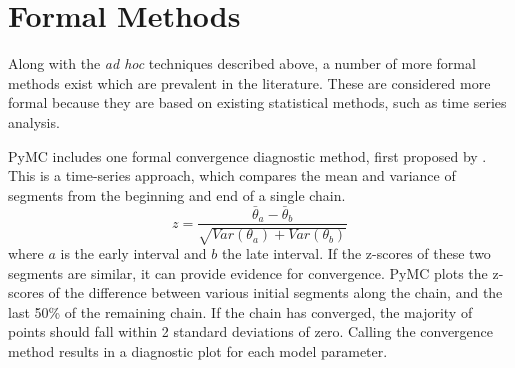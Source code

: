 \documentclass[]{book}
\begin{document}
\section*{Formal Methods}

Along with the \emph{ad hoc} techniques described above, a number of more formal methods exist which are prevalent in the literature. These are considered more formal because they are based on existing statistical methods, such as time series analysis.

PyMC includes one formal convergence diagnostic method, first proposed by \citet{Geweke:1992gm}. This is a time-series approach, which compares the mean and variance of segments from the beginning and end of a single chain.
\begin{equation}
z = \frac{\bar{\theta}_a - \bar{\theta}_b}{\sqrt{Var(\theta_a) + Var(\theta_b)}}
\end{equation}
where $a$ is the early interval and $b$ the late interval. If the z-scores of these two segments are similar, it can provide evidence for convergence. PyMC plots the z-scores of the difference between various initial segments along the chain, and the last 50\% of the remaining chain. If the chain has converged, the majority of points should fall within 2 standard deviations of zero. Calling the convergence method results in a diagnostic plot for each model parameter.
\end{document}
